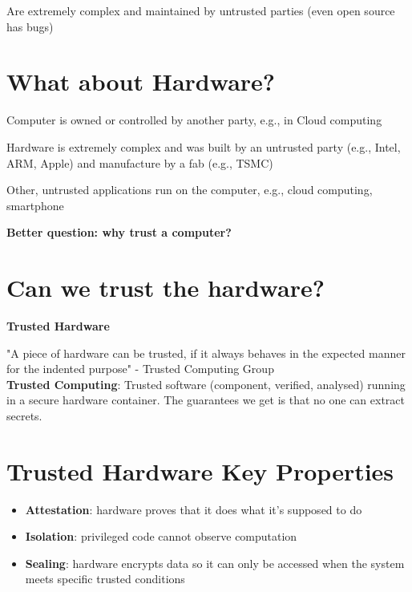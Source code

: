 \documentclass[11pt]{article}
\begin{document}
Are extremely complex and maintained by untrusted parties (even open source has bugs)

\section*{What about Hardware?}

Computer is owned or controlled by another party, e.g., in Cloud computing

Hardware is extremely complex and was built by an untrusted party (e.g., Intel, ARM, Apple) and manufacture by a fab (e.g., TSMC)

Other, untrusted applications run on the computer, e.g., cloud computing, smartphone

\textbf{Better question: why trust a computer?}

\section*{Can we trust the hardware?}
\begin{tcolorbox}[
  colback=gray!15,     %
  colframe=black!50,    %
  boxrule=1pt,       %
  arc=3mm,             %
  left=4mm, right=4mm, top=2mm, bottom=2mm %
]
\textbf{Trusted Hardware}

\vspace{0.3cm}

"A piece of hardware can be trusted, if it always behaves in the expected manner for the indented purpose" - Trusted Computing Group \\

\textbf{Trusted Computing}: Trusted software (component, verified, analysed) running in a secure hardware container. The guarantees we get is that no one can extract secrets.
\end{tcolorbox}

\section*{Trusted Hardware Key Properties}

\begin{itemize}
	\item \textbf{Attestation}: hardware proves that it does what it's supposed to do
	\item \textbf{Isolation}: privileged code cannot observe computation
	\item \textbf{Sealing}: hardware encrypts data so it can only be accessed when the system meets specific trusted conditions
\end{itemize}
\end{document}
